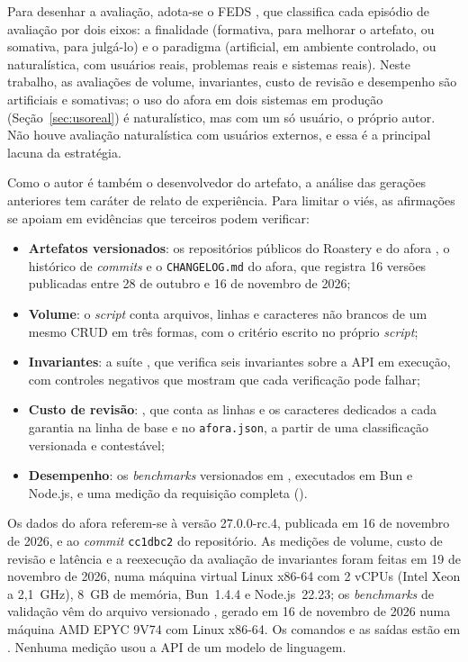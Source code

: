 \documentclass[a4paper,12pt]{article}
\newcommand{\estr}[1]{\textit{#1}}
\begin{document}
Para desenhar a avaliação, adota-se o FEDS \citep{venable2016}, que classifica cada episódio de avaliação por dois eixos: a finalidade (formativa, para melhorar o artefato, ou somativa, para julgá-lo) e o paradigma (artificial, em ambiente controlado, ou naturalística, com usuários reais, problemas reais e sistemas reais). Neste trabalho, as avaliações de volume, invariantes, custo de revisão e desempenho são artificiais e somativas; o uso do afora em dois sistemas em produção (Seção~\ref{sec:usoreal}) é naturalístico, mas com um só usuário, o próprio autor. Não houve avaliação naturalística com usuários externos, e essa é a principal lacuna da estratégia.

Como o autor é também o desenvolvedor do artefato, a análise das gerações anteriores tem caráter de relato de experiência. Para limitar o viés, as afirmações se apoiam em evidências que terceiros podem verificar:
\begin{itemize}
  \item \textbf{Artefatos versionados}: os repositórios públicos do Roastery \citep{anjos2026roastery} e do afora \citep{anjos2026afora}, o histórico de \estr{commits} e o \texttt{CHANGELOG.md} do afora, que registra 16 versões publicadas entre 28 de outubro e 16 de novembro de 2026;
  \item \textbf{Volume}: o \estr{script}  conta arquivos, linhas e caracteres não brancos de um mesmo CRUD em três formas, com o critério escrito no próprio \estr{script};
  \item \textbf{Invariantes}: a suíte , que verifica seis invariantes sobre a API em execução, com controles negativos que mostram que cada verificação pode falhar;
  \item \textbf{Custo de revisão}: , que conta as linhas e os caracteres dedicados a cada garantia na linha de base e no \texttt{afora.json}, a partir de uma classificação versionada e contestável;
  \item \textbf{Desempenho}: os \estr{benchmarks} versionados em , executados em Bun e Node.js, e uma medição da requisição completa ().
\end{itemize}

Os dados do afora referem-se à versão 27.0.0-rc.4, publicada em 16 de novembro de 2026, e ao \estr{commit} \texttt{cc1dbc2} do repositório. As medições de volume, custo de revisão e latência e a reexecução da avaliação de invariantes foram feitas em 19 de novembro de 2026, numa máquina virtual Linux x86-64 com 2 vCPUs (Intel Xeon a 2,1~GHz), 8~GB de memória, Bun~1.4.4 e Node.js~22.23; os \estr{benchmarks} de validação vêm do arquivo versionado , gerado em 16 de novembro de 2026 numa máquina AMD EPYC 9V74 com Linux x86-64. Os comandos e as saídas estão em . Nenhuma medição usou a API de um modelo de linguagem.
\end{document}
